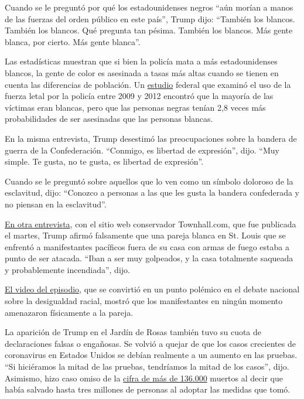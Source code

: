 Cuando se le preguntó por qué los estadounidenses negros ``aún morían a
manos de las fuerzas del orden público en este país'', Trump dijo:
``También los blancos. También los blancos. Qué pregunta tan pésima.
También los blancos. Más gente blanca, por cierto. Más gente blanca''.

Las estadísticas muestran que si bien la policía mata a más
estadounidenses blancos, la gente de color es asesinada a tasas más
altas cuando se tienen en cuenta las diferencias de población. Un
\href{https://www.ncbi.nlm.nih.gov/pmc/articles/PMC6080222/}{estudio}
federal que examinó el uso de la fuerza letal por la policía entre 2009
y 2012 encontró que la mayoría de las víctimas eran blancas, pero que
las personas negras tenían 2,8 veces más probabilidades de ser
asesinadas que las personas blancas.

En la misma entrevista, Trump desestimó las preocupaciones sobre la
bandera de guerra de la Confederación. ``Conmigo, es libertad de
expresión'', dijo. ``Muy simple. Te gusta, no te gusta, es libertad de
expresión''.

Cuando se le preguntó sobre aquellos que lo ven como un símbolo doloroso
de la esclavitud, dijo: ``Conozco a personas a las que les gusta la
bandera confederada y no piensan en la esclavitud''.

\href{https://www.youtube.com/watch?v=70Jzf0NhBv8}{En otra entrevista},
con el sitio web conservador Townhall.com, que fue publicada el martes,
Trump afirmó falsamente que una pareja blanca en St. Louis que se
enfrentó a manifestantes pacíficos fuera de su casa con armas de fuego
estaba a punto de ser atacada. ``Iban a ser muy golpeados, y la casa
totalmente saqueada y probablemente incendiada'', dijo.

\href{https://www.nytimes.com/video/us/politics/100000007214585/trump-white-couple-guns-st-louis.html}{El
video del episodio}, que se convirtió en un punto polémico en el debate
nacional sobre la desigualdad racial, mostró que los manifestantes en
ningún momento amenazaron físicamente a la pareja.

La aparición de Trump en el Jardín de Rosas también tuvo su cuota de
declaraciones falsas o engañosas. Se volvió a quejar de que los casos
crecientes de coronavirus en Estados Unidos se debían realmente a un
aumento en las pruebas. ``Si hiciéramos la mitad de las pruebas,
tendríamos la mitad de los casos'', dijo. Asimismo, hizo caso omiso de
la
\href{https://www.nytimes.com/es/interactive/2020/espanol/mundo/coronavirus-en-estados-unidos.html}{cifra
de más de 136.000} muertos al decir que había salvado hasta tres
millones de personas al adoptar las medidas que tomó.

